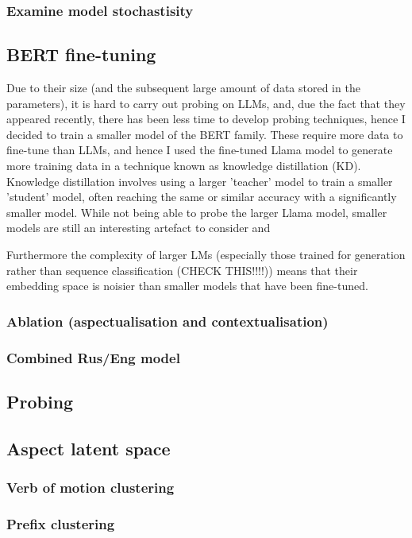 \subsubsection*{Examine model stochastisity}
\subsection*{BERT fine-tuning}
Due to their size (and the subsequent large amount of data stored in the parameters), it is hard to carry out probing on LLMs, and, due the fact that they appeared recently, there has been less time to develop probing techniques, hence I decided to train a smaller model of the BERT \citep{devlin2019bert} family. These require more data to fine-tune than LLMs, and hence I used the fine-tuned Llama model to generate more training data in a technique known as knowledge distillation (KD). Knowledge distillation involves using a larger 'teacher' model to train a smaller 'student' model, often reaching the same or similar accuracy with a significantly smaller model. While not being able to probe the larger Llama model, smaller models are still an interesting artefact to consider and 

Furthermore the complexity of larger LMs (especially those trained for generation rather than sequence classification (CHECK THIS!!!!)) means that their embedding space is noisier than smaller models that have been fine-tuned.


\subsubsection{Ablation (aspectualisation and contextualisation)}
\subsubsection{Combined Rus/Eng model}
\subsection{Probing}
\subsection{Aspect latent space}
\subsubsection{Verb of motion clustering}
\subsubsection{Prefix clustering}